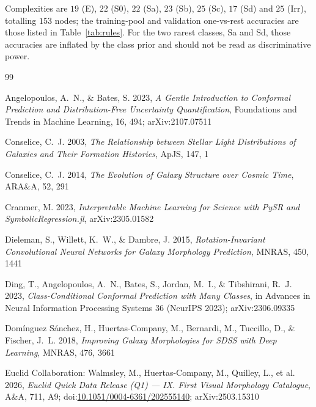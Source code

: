 \documentclass[11pt]{article}
\providecommand{\doi}[1]{doi:\href{https://doi.org/#1}{#1}}
\providecommand{\aap}{A\&A}
\providecommand{\apjs}{ApJS}
\providecommand{\araa}{ARA\&A}
\providecommand{\mnras}{MNRAS}
\begin{document}


\noindent
Complexities are $19$ (E), $22$ (S0), $22$ (Sa), $23$ (Sb), $25$ (Sc), $17$
(Sd) and $25$ (Irr), totalling $153$ nodes; the training-pool and validation
one-vs-rest accuracies are those listed in Table~\ref{tab:rules}. For the two rarest
classes, Sa and Sd, those accuracies are inflated by the class prior and
should not be read as discriminative power.

\clearpage
\begin{thebibliography}{99}

Angelopoulos, A.~N., \& Bates, S. 2023, \emph{A Gentle Introduction to
Conformal Prediction and Distribution-Free Uncertainty Quantification},
Foundations and Trends in Machine Learning, 16, 494; arXiv:2107.07511

Conselice, C.~J. 2003, \emph{The Relationship between Stellar Light
Distributions of Galaxies and Their Formation Histories}, \apjs, 147, 1

Conselice, C.~J. 2014, \emph{The Evolution of Galaxy Structure over Cosmic
Time}, \araa, 52, 291

Cranmer, M. 2023, \emph{Interpretable Machine Learning for Science with PySR
and SymbolicRegression.jl}, arXiv:2305.01582

Dieleman, S., Willett, K.~W., \& Dambre, J. 2015,
\emph{Rotation-Invariant Convolutional Neural Networks for Galaxy Morphology
Prediction}, \mnras, 450, 1441

Ding, T., Angelopoulos, A.~N., Bates, S., Jordan, M.~I., \& Tibshirani, R.~J.
2023, \emph{Class-Conditional Conformal Prediction with Many Classes}, in
Advances in Neural Information Processing Systems 36 (NeurIPS 2023);
arXiv:2306.09335

Domínguez Sánchez, H., Huertas-Company, M., Bernardi, M., Tuccillo, D., \&
Fischer, J.~L. 2018, \emph{Improving Galaxy Morphologies for SDSS with Deep
Learning}, \mnras, 476, 3661

Euclid Collaboration: Walmsley, M., Huertas-Company, M., Quilley, L., et al.
2026, \emph{Euclid Quick Data Release (Q1) --- IX. First Visual Morphology
Catalogue}, \aap, 711, A9; \doi{10.1051/0004-6361/202555140};
arXiv:2503.15310


\end{thebibliography}
\end{document}
